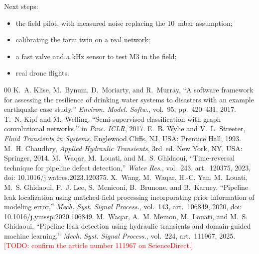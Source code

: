 \documentclass[conference]{IEEEtran}
\newcommand{\TODO}[1]{\textcolor{red}{[TODO: #1]}}
\begin{document}
Next steps:
\begin{itemize}
\item the field pilot, with measured noise replacing the 10~mbar assumption;
\item calibrating the farm twin on a real network;
\item a fast valve and a kHz sensor to test M3 in the field;
\item real drone flights.
\end{itemize}

\begin{thebibliography}{00}
 K.~A. Klise, M.~Bynum, D.~Moriarty, and R.~Murray, ``A software framework for assessing the resilience of drinking water systems to disasters with an example earthquake case study,'' \textit{Environ. Model. Softw.}, vol.~95, pp.~420--431, 2017.
 T.~N. Kipf and M.~Welling, ``Semi-supervised classification with graph convolutional networks,'' in \textit{Proc. ICLR}, 2017.
 E.~B. Wylie and V.~L. Streeter, \textit{Fluid Transients in Systems}. Englewood Cliffs, NJ, USA: Prentice Hall, 1993.
 M.~H. Chaudhry, \textit{Applied Hydraulic Transients}, 3rd~ed. New York, NY, USA: Springer, 2014.
 M.~Waqar, M.~Louati, and M.~S. Ghidaoui, ``Time-reversal technique for pipeline defect detection,'' \textit{Water Res.}, vol.~243, art.~120375, 2023, doi: 10.1016/j.watres.2023.120375.
 X.~Wang, M.~Waqar, H.-C. Yan, M.~Louati, M.~S. Ghidaoui, P.~J. Lee, S.~Meniconi, B.~Brunone, and B.~Karney, ``Pipeline leak localization using matched-field processing incorporating prior information of modeling error,'' \textit{Mech. Syst. Signal Process.}, vol.~143, art.~106849, 2020, doi: 10.1016/j.ymssp.2020.106849.
 M.~Waqar, A.~M. Memon, M.~Louati, and M.~S. Ghidaoui, ``Pipeline leak detection using hydraulic transients and domain-guided machine learning,'' \textit{Mech. Syst. Signal Process.}, vol.~224, art.~111967, 2025. \TODO{confirm the article number 111967 on ScienceDirect.}
\end{thebibliography}
\end{document}
